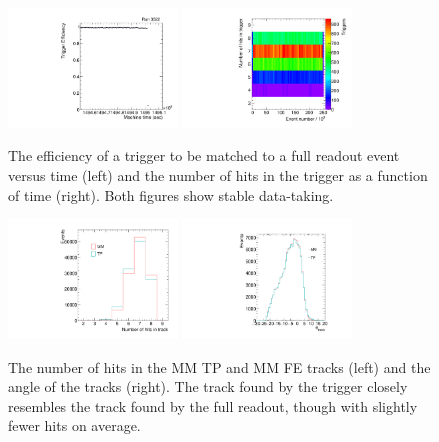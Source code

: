 \begin{figure}[!htpb]
  \begin{center}
    \includegraphics[width=0.4\textwidth]{figures/gbtanalysis3522/tpeff.pdf}
    \includegraphics[width=0.4\textwidth]{figures/tuna_analysis/trigger_hits_vs_event.pdf}
  \end{center}
  \vspace{-10pt}
  \caption{The efficiency of a trigger to be matched to a full readout event versus time (left) and the number of hits in the trigger as a function of time (right). Both figures show stable data-taking.}
  \label{fig:lowlevel}
\end{figure}

\begin{figure}[!htpb]
  \begin{center}
    \includegraphics[width=0.4\textwidth]{figures/tuna_analysis/trigger_nart.pdf}
    \includegraphics[width=0.4\textwidth]{figures/gbtanalysis3522/ang.pdf}
  \end{center}
  \vspace{-10pt}
  \caption{The number of hits in the MM TP and MM FE tracks (left) and the angle of the tracks (right). The track found by the trigger closely resembles the track found by the full readout, though with slightly fewer hits on average.}
  \label{fig:tp_vs_fe}
\end{figure}

